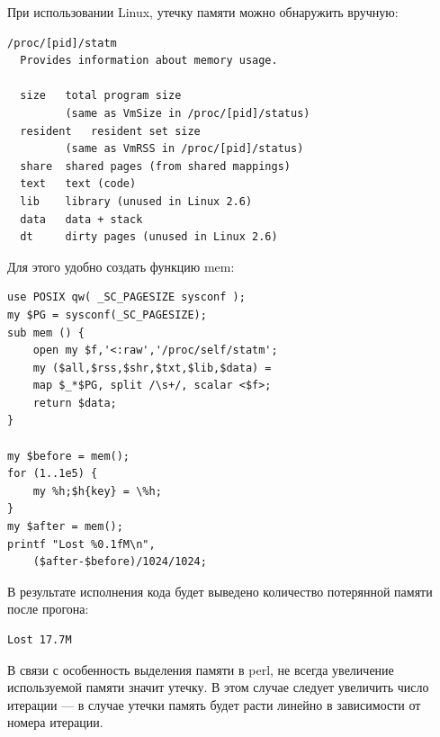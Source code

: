При использовании Linux, утечку памяти можно обнаружить вручную:
\begin{verbatim}
/proc/[pid]/statm
  Provides information about memory usage.

  size   total program size
         (same as VmSize in /proc/[pid]/status)
  resident   resident set size
         (same as VmRSS in /proc/[pid]/status)
  share  shared pages (from shared mappings)
  text   text (code)
  lib    library (unused in Linux 2.6)
  data   data + stack
  dt     dirty pages (unused in Linux 2.6)
\end{verbatim}
Для этого удобно создать функцию mem:
\begin{verbatim}
use POSIX qw( _SC_PAGESIZE sysconf );
my $PG = sysconf(_SC_PAGESIZE);
sub mem () {
    open my $f,'<:raw','/proc/self/statm';
    my ($all,$rss,$shr,$txt,$lib,$data) =
    map $_*$PG, split /\s+/, scalar <$f>;
    return $data;
}

my $before = mem();
for (1..1e5) {
    my %h;$h{key} = \%h;
}
my $after = mem();
printf "Lost %0.1fM\n",
    ($after-$before)/1024/1024;
\end{verbatim}
В результате исполнения кода будет выведено количество потерянной памяти после прогона:
\begin{verbatim}
Lost 17.7M
\end{verbatim}
В связи с особенность выделения памяти в perl, не всегда увеличение используемой памяти значит утечку. В этом случае следует увеличить число итерации --- в случае утечки память будет расти линейно в зависимости от номера итерации.

